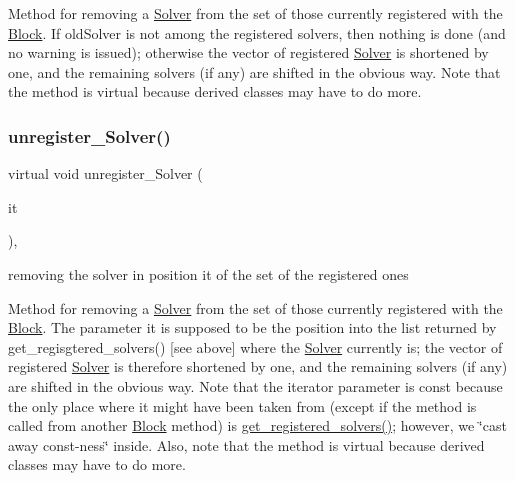 Method for removing a \mbox{\hyperlink{class_s_m_spp__di__unipi__it_1_1_solver}{Solver}} from the set of those currently registered with the \mbox{\hyperlink{class_s_m_spp__di__unipi__it_1_1_block}{Block}}. If old\+Solver is not among the registered solvers, then nothing is done (and no warning is issued); otherwise the vector of registered \mbox{\hyperlink{class_s_m_spp__di__unipi__it_1_1_solver}{Solver}} is shortened by one, and the remaining solvers (if any) are shifted in the obvious way. Note that the method is virtual because derived classes may have to do more. \mbox{\label{class_s_m_spp__di__unipi__it_1_1_block_a5cd5238acd84dd259f3bedb0da4e64c3}} 
\subsubsection{\texorpdfstring{unregister\+\_\+\+Solver()}{unregister\_Solver()}\hspace{0.1cm}{\footnotesize\ttfamily [2/2]}}
{\footnotesize\ttfamily virtual void unregister\+\_\+\+Solver (\begin{DoxyParamCaption}\item[{\mbox{\hyperlink{namespace_s_m_spp__di__unipi__it_a8d60e91b37db595a92964f6f4a52bf17}{c\+\_\+\+Lst\+\_\+\+Solver\+\_\+it}}}]{it }\end{DoxyParamCaption})\hspace{0.3cm}{\ttfamily [inline]}, {\ttfamily [virtual]}}



removing the solver in position it of the set of the registered ones 

Method for removing a \mbox{\hyperlink{class_s_m_spp__di__unipi__it_1_1_solver}{Solver}} from the set of those currently registered with the \mbox{\hyperlink{class_s_m_spp__di__unipi__it_1_1_block}{Block}}. The parameter it is supposed to be the position into the list returned by get\+\_\+regisgtered\+\_\+solvers() \mbox{[}see above\mbox{]} where the \mbox{\hyperlink{class_s_m_spp__di__unipi__it_1_1_solver}{Solver}} currently is; the vector of registered \mbox{\hyperlink{class_s_m_spp__di__unipi__it_1_1_solver}{Solver}} is therefore shortened by one, and the remaining solvers (if any) are shifted in the obvious way. Note that the iterator parameter is const because the only place where it might have been taken from (except if the method is called from another \mbox{\hyperlink{class_s_m_spp__di__unipi__it_1_1_block}{Block}} method) is \mbox{\hyperlink{class_s_m_spp__di__unipi__it_1_1_block_a052e250efe81b0840361e70c520bdd7f}{get\+\_\+registered\+\_\+solvers()}}; however, we \char`\"{}cast away const-\/ness\char`\"{} inside. Also, note that the method is virtual because derived classes may have to do more.

